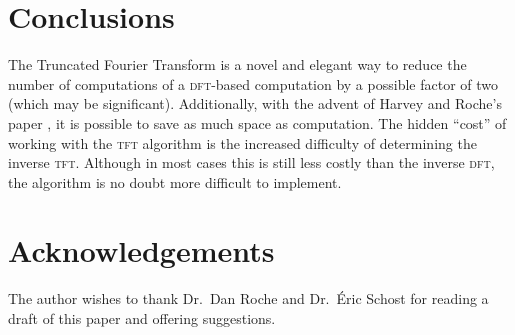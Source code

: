 \documentclass[12pt]{article}
\theoremstyle{definition}
\newcommand{\0}{\mathbf{0}}
\theoremstyle{theorem}
\theoremstyle{definition}
\begin{document}
\section{Conclusions}
The Truncated Fourier Transform is a novel and elegant way to reduce the number of computations of a \textsc{dft}-based computation by a possible factor of two (which may be significant). Additionally, with the advent of Harvey and Roche's paper \cite{InPlaceTFT}, it is possible to save as much space as computation. The hidden ``cost'' of working with the \textsc{tft} algorithm is the increased difficulty of determining the inverse \textsc{tft}. Although in most cases this is still less costly than the inverse \textsc{dft}, the algorithm is no doubt more difficult to implement.

\section*{Acknowledgements}
The author wishes to thank Dr.\ Dan Roche and Dr.\ \'Eric Schost for reading a draft of this paper and offering suggestions. 



\end{document}
